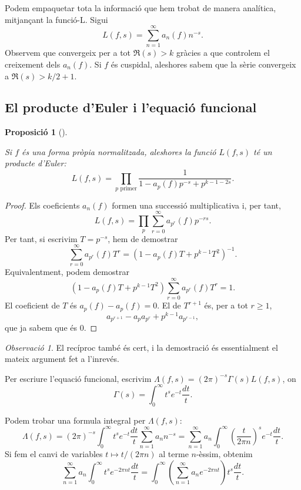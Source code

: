 \documentclass[
  letterpaper,
  DIV=11,
  numbers=noendperiod]{scrreprt}
\theoremstyle{plain}
\theoremstyle{plain}
\theoremstyle{definition}
\theoremstyle{plain}
\newtheorem{proposition}{Proposició}[chapter]
\theoremstyle{plain}
\theoremstyle{definition}
\theoremstyle{remark}
\newtheorem{refremark}{Observació}[chapter]
\begin{document}
Podem empaquetar tota la informació que hem trobat de manera analítica,
mitjançant la funció-L. Sigui \[
L(f,s) = \sum_{n=1}^\infty a_n(f)n^{-s}.
\] Observem que convergeix per a tot \(\Re(s)>k\) gràcies a que
controlem el creixement dels \(a_n(f)\). Si \(f\) és cuspidal, aleshores
sabem que la sèrie convergeix a \(\Re(s)>k/2+1\).

\subsection{El producte d'Euler i l'equació
funcional}\label{el-producte-deuler-i-lequaciuxf3-funcional}

\begin{proposition}[]\protect\hypertarget{prp-}{}\label{prp-}

Si \(f\) és una forma pròpia normalitzada, aleshores la funció
\(L(f,s)\) té un producte d'Euler: \[
L(f,s) = \prod_{p\text{ primer}} \frac{1}{1-a_p(f)p^{-s} + p^{k-1-2s}}.
\]

\end{proposition}

\begin{proof}
Els coeficients \(a_{n}(f)\) formen una successió multiplicativa i, per
tant, \[
L(f,s) = \prod_p \sum_{r=0}^\infty a_{p^r}(f)p^{-rs}.
\] Per tant, si escrivim \(T=p^{-s}\), hem de demostrar \[
\sum_{r=0}^\infty a_{p^r}(f)T^r = \left(1-a_p(f)T + p^{k-1}T^2\right)^{-1}.
\] Equivalentment, podem demostrar \[
\left(1-a_p(f)T + p^{k-1}T^2\right)\sum_{r=0}^\infty a_{p^r}(f)T^r = 1.
\] El coeficient de \(T\) és \(a_p(f)-a_p(f)=0\). El de \(T^{r+1}\) és,
per a tot \(r\geq 1\), \[
a_{p^{r+1}} - a_pa_{p^{r}} + p^{k-1}a_{p^{r-1}},
\] que ja sabem que és \(0\).
\end{proof}

\begin{refremark}
El recíproc també és cert, i la demostració és essentialment el mateix
argument fet a l'inrevés.

\label{rem-}

\end{refremark}

Per escriure l'equació funcional, escrivim
\(\Lambda(f,s) = (2\pi)^{-s} \Gamma(s) L(f,s)\), on \[
\Gamma(s) = \int_0^{\infty} t^{s}e^{-t}\frac{dt}{t}.
\]

Podem trobar una formula integral per \(\Lambda(f,s)\): \[
\Lambda(f,s) = (2\pi)^{-s} \int_0^\infty t^s e^{-t}\frac{dt}{t} \sum_{n=1}^\infty a_nn^{-s} = \sum_{n=1}^\infty a_n \int_0^\infty \left(\frac{t}{2\pi n}\right)^s e^{-t}\frac{dt}{t}.
\] Si fem el canvi de variables \(t\mapsto t/(2\pi n)\) al terme
\(n\)-èssim, obtenim \[
\sum_{n=1}^\infty a_n\int_0^\infty t^s e^{-2\pi n t} \frac{dt}{t} = \int_0^\infty \left(\sum_{n=1}^\infty a_ne^{-2\pi nt}\right) t^s\frac{dt}{t}.
\]
\end{document}
